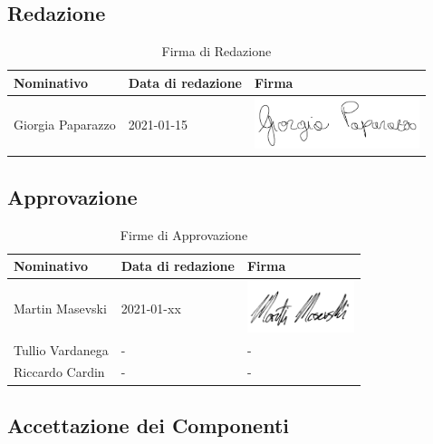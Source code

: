 \documentclass[../piano_di_progetto.tex]{subfiles}
\begin{document}
\subsection{Redazione}%
\label{sub:red}

\begin{table}[!ht]
	\centering
	\begin{tabular}{|l|l|l|}
		\hline
		\rowcolor{lightgray}
		\textbf{Nominativo} & \textbf{Data di redazione} & \textbf{Firma} \\ 
		\hline
			Giorgia Paparazzo & 2021-01-15 & \includegraphics[height=1.5cm]{componenti/img/firma_gp.png} \\
		\hline
	\end{tabular}
	\caption{Firma di Redazione}
\end{table}


\subsection{Approvazione}%
\label{sub:app}

\begin{table}[!ht]
	\centering
	\begin{tabular}{|l|l|l|}
		\hline
		\rowcolor{lightgray}
		\textbf{Nominativo} & \textbf{Data di redazione} & \textbf{Firma} \\ 

		\hline
			Martin Masevski & 2021-01-xx & \includegraphics[height=1.5cm]{componenti/img/firma_mm.png} \\ 
		\hline
			Tullio Vardanega & - & - \\
		\hline
			Riccardo Cardin  & - & - \\
		\hline
	\end{tabular}
		\caption{Firme di Approvazione}
\end{table}


\newpage
\subsection{Accettazione dei Componenti}%
\label{sub:acc_comp}
\end{document}
